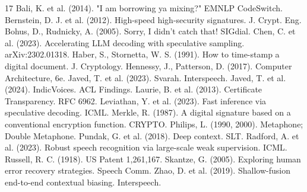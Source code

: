 \documentclass[conference]{IEEEtran}
\begin{document}
\begin{thebibliography}{17}
 Bali, K. et al. (2014). "I am borrowing ya mixing?" EMNLP CodeSwitch.
 Bernstein, D. J. et al. (2012). High-speed high-security signatures. J. Crypt. Eng.
 Bohus, D., Rudnicky, A. (2005). Sorry, I didn't catch that! SIGdial.
 Chen, C. et al. (2023). Accelerating LLM decoding with speculative sampling. arXiv:2302.01318.
 Haber, S., Stornetta, W. S. (1991). How to time-stamp a digital document. J. Cryptology.
 Hennessy, J., Patterson, D. (2017). Computer Architecture, 6e.
 Javed, T. et al. (2023). Svarah. Interspeech.
 Javed, T. et al. (2024). IndicVoices. ACL Findings.
 Laurie, B. et al. (2013). Certificate Transparency. RFC 6962.
 Leviathan, Y. et al. (2023). Fast inference via speculative decoding. ICML.
 Merkle, R. (1987). A digital signature based on a conventional encryption function. CRYPTO.
 Philips, L. (1990, 2000). Metaphone; Double Metaphone.
 Pundak, G. et al. (2018). Deep context. SLT.
 Radford, A. et al. (2023). Robust speech recognition via large-scale weak supervision. ICML.
 Russell, R. C. (1918). US Patent 1,261,167.
 Skantze, G. (2005). Exploring human error recovery strategies. Speech Comm.
 Zhao, D. et al. (2019). Shallow-fusion end-to-end contextual biasing. Interspeech.
\end{thebibliography}
\end{document}
